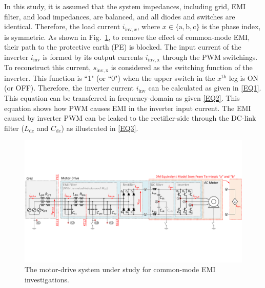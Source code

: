 \documentclass[journal,a4paper,10pt,twoside]{IEEEtran} %
\begin{document}
		In this study, it is assumed that the system impedances, including grid, EMI filter, and load impedances, are balanced, and all diodes and switches are identical. Therefore, the load current $i_{\mathrm{inv},x}$, where $x{\in}\{\mathrm{a,b,c}\}$ is the phase index, is symmetric. As shown in Fig.~\ref{FIG1}, to remove the effect of common-mode EMI, their path to the protective earth (PE) is blocked.
		The input current of the inverter $i_\mathrm{inv}$ is formed by its output currents $i_\mathrm{inv,x}$ through the PWM switchings. To reconstruct this current, $s_\mathrm{inv,x}$ is considered as the switching function of the inverter. This function is ``1" (or ``0") when the upper switch in the $x^\mathrm{th}$ leg is ON (or OFF). Therefore, the inverter current $i_\mathrm{inv}$ can be calculated as given in \eqref{EQ1}. This equation can be transferred in frequency-domain as given \eqref{EQ2}. This equation shows how PWM causes EMI in the inverter input current. The EMI caused by inverter PWM can be leaked to the rectifier-side through the DC-link filter ($L_\mathrm{dc}$ and $C_\mathrm{dc}$) as illustrated in \eqref{EQ3}.
		
		\begin{figure}[t]
			    \centering
			    \includegraphics[clip, trim=0cm 5cm 0cm 5cm, width=1\linewidth]{FIGS/FIG_1.pdf}
			    \caption{The motor-drive system under study for common-mode EMI investigations.}
			    \label{FIG1}
			    \vspace{-5mm}
	    \end{figure}
		
\end{document}
